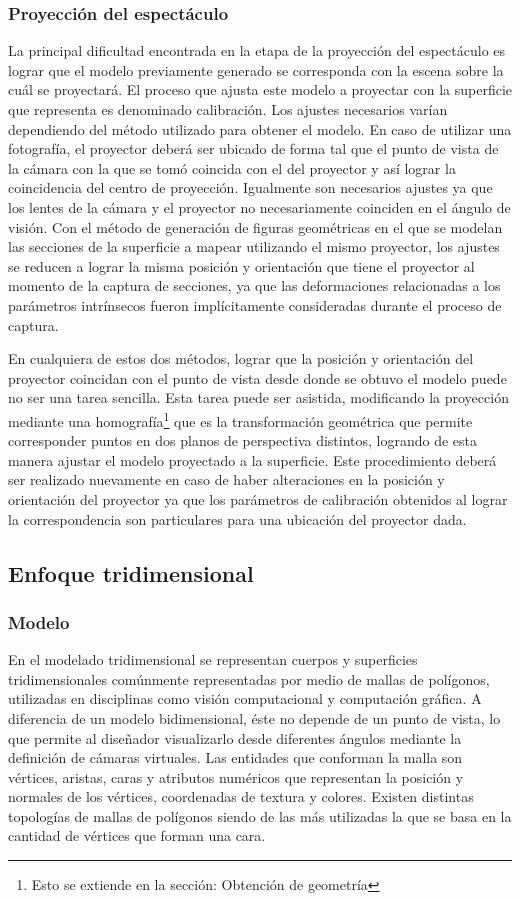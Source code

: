\subsubsection{Proyección del espectáculo}
La principal dificultad encontrada en la etapa de la proyección del espectáculo es lograr que el modelo previamente generado se corresponda con la escena sobre la cuál se proyectará. El proceso que ajusta este modelo a proyectar con la superficie que representa es denominado calibración.
Los ajustes necesarios varían dependiendo del método utilizado para obtener el modelo. En caso de utilizar una fotografía, el proyector deberá ser ubicado de forma tal que el punto de vista de la cámara con la que se tomó coincida con el del proyector y así lograr la coincidencia del centro de proyección. Igualmente son necesarios ajustes ya que los lentes de la cámara y el proyector no necesariamente coinciden en el ángulo de visión.
Con el método de generación de figuras geométricas en el que se modelan las secciones de la superficie a mapear utilizando el mismo proyector, los ajustes se reducen a lograr la misma posición y orientación que tiene el proyector al momento de la captura de secciones, ya que las deformaciones relacionadas a los parámetros intrínsecos fueron implícitamente consideradas durante el proceso de captura.

En cualquiera de estos dos métodos, lograr que la posición y orientación del proyector coincidan con el punto de vista desde donde se obtuvo el modelo puede no ser una tarea sencilla. Esta tarea puede ser asistida, modificando la proyección mediante una homografía\footnote{Esto se extiende en la sección: Obtención de geometría} que es la transformación geométrica que permite corresponder puntos en dos planos de perspectiva distintos, logrando de esta manera ajustar el modelo proyectado a la superficie.
Este procedimiento deberá ser realizado nuevamente en caso de haber alteraciones en la posición y orientación del proyector ya que los parámetros de calibración obtenidos al lograr la correspondencia son particulares para una ubicación del proyector dada.

\subsection{Enfoque tridimensional}
\subsubsection{Modelo}
En el modelado tridimensional se representan cuerpos y superficies tridimensionales comúnmente representadas por medio de mallas de polígonos, utilizadas en disciplinas como visión computacional y computación gráfica. A diferencia de un modelo bidimensional, éste no depende de un punto de vista, lo que permite al diseñador visualizarlo desde diferentes ángulos mediante la definición de cámaras virtuales. Las entidades que conforman la malla son vértices, aristas, caras y atributos numéricos que representan la posición y normales de los vértices, coordenadas de textura y colores. Existen distintas topologías de mallas de polígonos siendo de las más utilizadas la que se basa en la cantidad de vértices que forman una cara.

